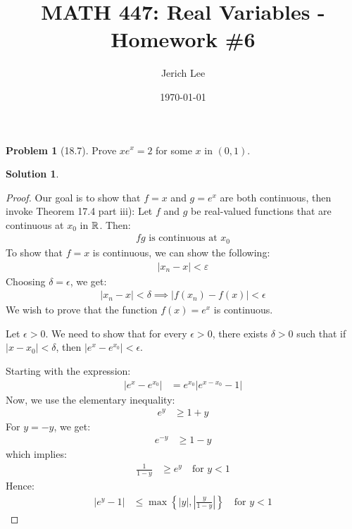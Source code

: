 \documentclass[12pt]{article}
\title{MATH 447: Real Variables - Homework \#6}
\author{Jerich Lee}
\date{\today}
\theoremstyle{definition} %
\newtheorem{solution}{Solution}
\newtheorem{problem}{Problem}
\theoremstyle{plain} %
\begin{document}
\maketitle
\begin{problem}[18.7]
  Prove \(xe^{x} =2\) for some \(x\) in \((0,1)\).  
\end{problem}
\begin{solution}
  \begin{proof}
    Our goal is to show that \(f=x\) and \(g=e^{x}\) are both continuous, then invoke Theorem 17.4 part iii): Let \(f\) and \(g\) be real-valued functions that are continuous at \(x_0\) in \(\mathbb{\MakeUppercase{r}} \). Then: 
    \begin{align}
     fg \text{ is continuous at } x_0 
    \end{align}
    To show that \(f=x\) is continuous, we can show the following:
    \begin{align}
     \left\vert x_n -x\right\vert <\varepsilon
    \end{align}
    Choosing \(\delta =\epsilon \), we get:
    \begin{align}
     \left\vert x_{n} -x \right\vert <\delta \implies \left\vert f(x_n)-f(x) \right\vert <\epsilon
    \end{align} 
    We wish to prove that the function \( f(x) = e^x \) is continuous.
  
    Let \( \epsilon > 0 \). We need to show that for every \( \epsilon > 0 \), there exists \( \delta > 0 \) such that if \( |x - x_0| < \delta \), then \( |e^x - e^{x_0}| < \epsilon \).
    
    Starting with the expression:
    \begin{align}
    |e^x - e^{x_0}| &= e^{x_0} |e^{x - x_0} - 1|
    \end{align}
    Now, we use the elementary inequality:
    \begin{align}
    e^y &\geq 1 + y
    \end{align}
    For \( y = -y \), we get:
    \begin{align}
    e^{-y} &\geq 1 - y
    \end{align}
    which implies:
    \begin{align}
    \frac{1}{1 - y} &\geq e^y \quad \text{for } y < 1
    \end{align}
    Hence:
    \begin{align}
    |e^y - 1| &\leq \max \left\{ |y|, \left| \frac{y}{1 - y} \right| \right\} \quad \text{for } y < 1
    \end{align}
    

\end{proof}
\end{solution}
\end{document}
